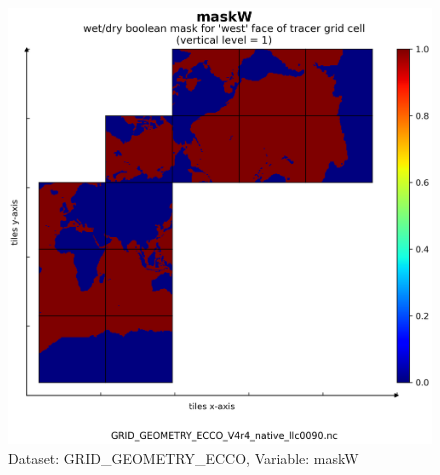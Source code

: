 \begin{figure}[H]
\centering
\includegraphics[scale=0.55]{../images/plots/v4r4/native_plots_coords/Geometry_Parameters_for_the_Lat-Lon-Cap_90_(llc90)_Native_Model_Grid_(Version_4_Release_4)/maskW.png}
\caption{Dataset: GRID\_GEOMETRY\_ECCO, Variable: maskW}
\label{tab:table-GRID_GEOMETRY_ECCO_maskW-Plot}
\end{figure}
\newpage
\pagebreak
